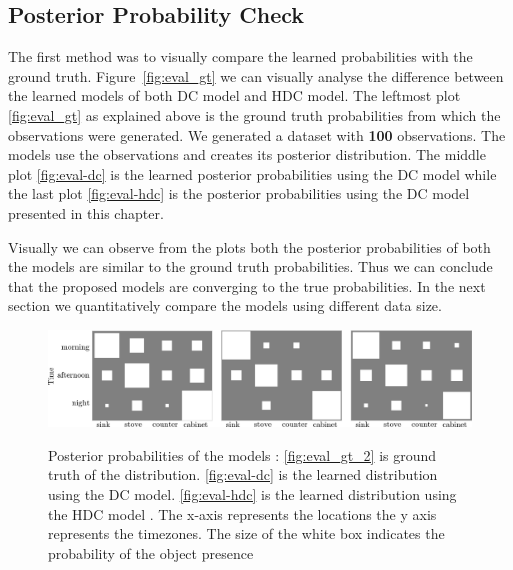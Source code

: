 \subsection{Posterior Probability Check}
The first method was to visually compare the learned probabilities with the ground truth.  Figure~\ref{fig:eval_gt} we can visually analyse the difference between the learned models of both DC model and HDC model. The leftmost plot \ref{fig:eval_gt} as explained above is the ground truth probabilities from which the observations were generated. We generated a dataset with \textbf{100} observations. The models use the observations and creates its posterior distribution. The middle plot \ref{fig:eval-dc} is the learned posterior probabilities using the DC model while the last plot \ref{fig:eval-hdc} is the posterior probabilities using the DC model presented in this chapter. 

Visually we can observe from the plots both the posterior probabilities of both the models are similar to the ground truth probabilities. Thus we can conclude that the proposed models are converging to the true probabilities. In the next section we quantitatively compare the models using different data size.

\begin{figure}
    \centering
    \includegraphics[width=\textwidth]{images/eval_gt_DC_HDC.png}
       
    \begin{minipage}[t]{.35\textwidth}
    \label{fig:eval_gt_2}
    \end{minipage}%
    \begin{minipage}[t]{.3\textwidth}
    \label{fig:eval-dc}
    \end{minipage}
    \begin{minipage}[t]{.25\textwidth}
    \label{fig:eval-hdc}
    \end{minipage}

\caption[Posterior probabilities of DC and HDC ]{Posterior probabilities of the models : \ref{fig:eval_gt_2} is ground truth of the distribution. \ref{fig:eval-dc} is the learned distribution using the DC model. \ref{fig:eval-hdc} is the learned distribution using the HDC  model . The x-axis represents the locations the y axis represents the timezones. The size of the white box indicates the probability of the object presence }\label{fig:eval-dc-hdc}
    
\end{figure}

